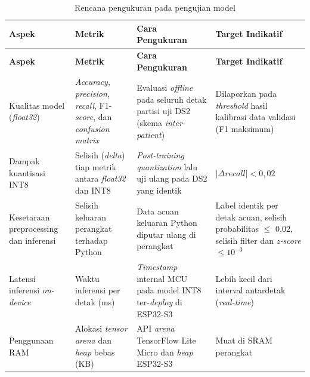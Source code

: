 \begin{center}
  \setlength{\tabcolsep}{4pt}
  \renewcommand{\arraystretch}{1.15}
  \small
  \begin{longtable}{>{\RaggedRight\arraybackslash}p{2.5cm}>{\RaggedRight\arraybackslash}p{3.2cm}>{\RaggedRight\arraybackslash}p{4.6cm}>{\RaggedRight\arraybackslash}p{2.5cm}}
    \caption{Rencana pengukuran pada pengujian model}
    \label{tab:pengujian-model} \\
    \toprule
    \textbf{Aspek} & \textbf{Metrik} & \textbf{Cara Pengukuran} & \textbf{Target Indikatif} \\
    \midrule
    \endfirsthead
    \toprule
    \textbf{Aspek} & \textbf{Metrik} & \textbf{Cara Pengukuran} & \textbf{Target Indikatif} \\
    \midrule
    \endhead
    \bottomrule
    \endfoot
    Kualitas model (\textit{float32}) &
    \textit{Accuracy}, \textit{precision}, \textit{recall}, F1-\textit{score}, dan \textit{confusion matrix} &
    Evaluasi \textit{offline} pada seluruh detak partisi uji DS2 (skema \textit{inter-patient}) &
    Dilaporkan pada \textit{threshold} hasil kalibrasi data validasi (F1 maksimum) \\
    Dampak kuantisasi INT8 &
    Selisih (\textit{delta}) tiap metrik antara \textit{float32} dan INT8 &
    \textit{Post-training quantization} lalu uji ulang pada DS2 yang identik &
    $|\Delta \textit{recall}| < 0{,}02$ \\
    Kesetaraan preprocessing dan inferensi &
    Selisih keluaran perangkat terhadap Python &
    Data acuan keluaran Python diputar ulang di perangkat &
    Label identik per detak acuan, selisih probabilitas $\leq$ 0,02, selisih filter dan \textit{z-score} $\leq 10^{-3}$ \\
    Latensi inferensi \textit{on-device} &
    Waktu inferensi per detak (ms) &
    \textit{Timestamp} internal MCU pada model INT8 ter-\textit{deploy} di ESP32-S3 &
    Lebih kecil dari interval antardetak (\textit{real-time}) \\
    Penggunaan RAM &
    Alokasi \textit{tensor arena} dan \textit{heap} bebas (KB) &
    API \textit{arena} TensorFlow Lite Micro dan \textit{heap} ESP32-S3 &
    Muat di SRAM perangkat \\

\end{longtable}
\end{center}
